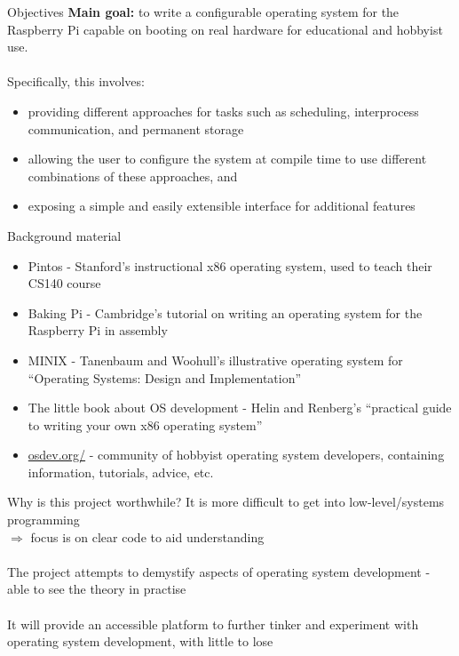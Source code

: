 \documentclass[10pt]{beamer}
\begin{document}
\begin{frame}{Objectives}
    \textbf{Main goal:}
    to write a configurable operating system for the Raspberry Pi capable on booting on real hardware for educational and hobbyist use. \\~\\

    Specifically, this involves:
    \begin{itemize}
        \item providing different approaches for tasks such as scheduling, interprocess communication, and permanent storage
        \item allowing the user to configure the system at compile time to use different combinations of these approaches, and
        \item exposing a simple and easily extensible interface for additional features
    \end{itemize}
\end{frame}

\begin{frame}{Background material}
    \begin{itemize}
        \item Pintos - Stanford's instructional x86 operating system, used to teach their CS140 course
        \item Baking Pi - Cambridge's tutorial on writing an operating system for the Raspberry Pi in assembly
        \item MINIX - Tanenbaum and Woohull's illustrative operating system for ``Operating Systems: Design and Implementation''
        \item The little book about OS development - Helin and Renberg's ``practical guide to writing your own x86 operating system''
        \item \url{osdev.org/} - community of hobbyist operating system developers, containing information, tutorials, advice, etc.
    \end{itemize}
\end{frame}

\begin{frame}{Why is this project worthwhile?}
\centering
    It is more difficult to get into low-level/systems programming \\
    $\Rightarrow$ focus is on clear code to aid understanding \\~\\

    The project attempts to demystify aspects of operating system development - able to see the theory in practise \\~\\

    It will provide an accessible platform to further tinker and experiment with operating system development, with little to lose
\end{frame}
\end{document}
